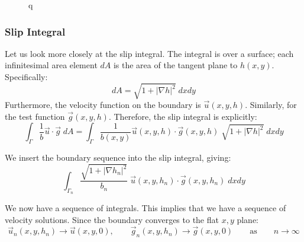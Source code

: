 \documentclass[12pt, a4paper, twoside, openright]{book}
\begin{document}
\begin{figure}[ht]
\centering
{}
\caption{q}\label{q}
\end{figure}

\subsubsection*{Slip Integral}

Let us look more closely at the slip integral.  The integral is over a surface; each infinitesimal area element $dA$ is the area of the tangent plane to $h(x,y)$. Specifically:
\begin{equation}
dA = \sqrt{1 + \lvert \nabla h \rvert^2} \;dxdy
\end{equation}
Furthermore, the velocity function on the boundary is $\vec{u}(x,y,h)$.  Similarly, for the test function $\vec{g}(x,y,h)$.
Therefore, the slip integral is explicitly:
\begin{equation}
\int_{\Gamma} \frac{1}{b} \vec{u} \cdot \vec{g} \;dA =
\int_{\Gamma} \frac{1}{b(x,y)} \vec{u}(x,y,h) \cdot \vec{g}(x,y,h) 
\;\sqrt{1 + \lvert \nabla h \rvert^2} \;dxdy
\end{equation}

We insert the boundary sequence into the slip integral, giving:
\begin{equation}
\int_{\Gamma_n} \frac{\sqrt{1 + \lvert \nabla h_n \rvert^2}}{b_n} \;
 \vec{u}(x,y,h_n) \cdot \vec{g}(x,y,h_n) \;dxdy
\end{equation}

We now have a sequence of integrals.  This implies that we have a sequence of velocity solutions.  Since the boundary converges to the flat $x,y$ plane:
\begin{equation}
\vec{u}_n(x,y,h_n) \to \vec{u}(x,y,0), \qquad \vec{g}_n(x,y,h_n) \to \vec{g}(x,y,0)
\qquad \text{as} \qquad n \to \infty
\end{equation}
\end{document}
